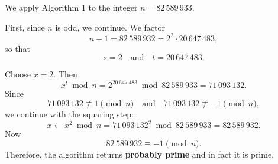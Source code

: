 We apply Algorithm 1 to the integer $n=82\,589\,933$.

First, since $n$ is odd, we continue. We factor
\[
n-1 = 82\,589\,932 = 2^2 \cdot 20\,647\,483,
\]
so that
\[
s=2 \quad \text{and} \quad t=20\,647\,483.
\]

Choose $x=2$. Then
\[
x^t \bmod n = 2^{20\,647\,483} \bmod 82\,589\,933 = 71\,093\,132.
\]
Since
\[
71\,093\,132 \not\equiv 1 \pmod n
\quad \text{and} \quad
71\,093\,132 \not\equiv -1 \pmod n,
\]
we continue with the squaring step:
\[
x \leftarrow x^2 \bmod n = 71\,093\,132^2 \bmod 82\,589\,933 = 82\,589\,932.
\]
Now
\[
82\,589\,932 \equiv -1 \pmod n.
\]
Therefore, the algorithm returns \textbf{probably prime} and in fact it is prime.
